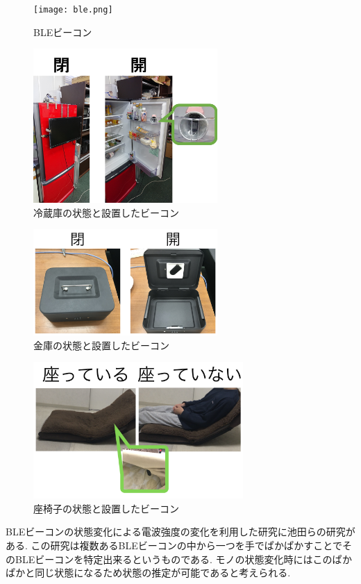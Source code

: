 \documentclass[Japanese]{dicomopapers}
\begin{document}
\begin{figure}[ht]
    \centering
    \texttt{[image: ble.png]}
    \caption{BLEビーコン}
    \label{beacon}
   \end{figure}
\begin{figure}[ht]
    \centering
    \includegraphics[width=7cm]{regisW2.png}
    \caption{冷蔵庫の状態と設置したビーコン}
    \label{freezer}
\end{figure}
\begin{figure}[ht]
    \centering
    \includegraphics[width=7cm]{kinkoW.png}
    \caption{金庫の状態と設置したビーコン}
    \label{safe}
\end{figure}
\begin{figure}[ht]
    \centering
    \includegraphics[width=8cm]{zaisuW.png}
    \caption{座椅子の状態と設置したビーコン}
    \label{chair}
\end{figure}

BLEビーコンの状態変化による電波強度の変化を利用した研究に池田ら\cite{BLEpkpk}の研究がある.
この研究は複数あるBLEビーコンの中から一つを手でぱかぱかすことでそのBLEビーコンを特定出来るというものである.
モノの状態変化時にはこのぱかぱかと同じ状態になるため状態の推定が可能であると考えられる.
\end{document}

